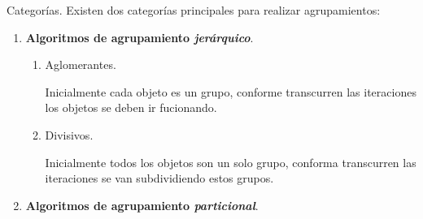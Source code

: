 \begin{frame}[fragile]{Categorías.}{}
  Existen dos categorías principales para realizar agrupamientos:
  \begin{enumerate}
  \item \textbf{Algoritmos de agrupamiento \textit{jerárquico}}.
    \begin{enumerate}
    \item Aglomerantes.
      
      Inicialmente cada objeto es un grupo, conforme transcurren las
      iteraciones los objetos se deben ir fucionando.
    \item Divisivos.
      
      Inicialmente todos los objetos son un solo grupo, conforma transcurren
      las iteraciones se van subdividiendo estos grupos.
    \end{enumerate}
  \item \textbf{Algoritmos de agrupamiento \textit{particional}}.
    

\end{enumerate}
\end{frame}
